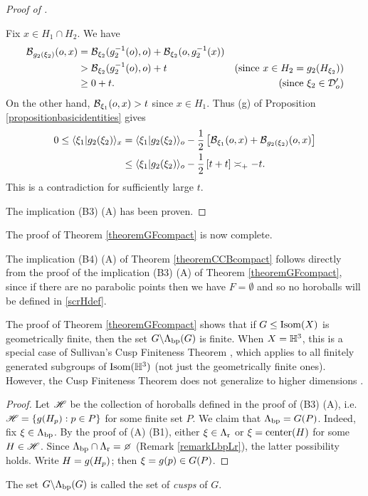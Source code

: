 \begin{proof}[Proof of  \implies {}]
\begin{subproof}
Fix $x\in H_1\cap H_2$. We have
\begin{align*}
\operatorname{\mathcal B}_{g_2(\xi_2)}(o,x) &= \operatorname{\mathcal B}_{\xi_2}(g_2^{-1}(o),o) + \operatorname{\mathcal B}_{\xi_2}(o,g_2^{-1}(x))\\
&> \operatorname{\mathcal B}_{\xi_2}(g_2^{-1}(o),o) + t & \textup{(since $x\in H_2 = g_2(H_{\xi_2})$)}\\
&\geq 0 + t. & \textup{(since $\xi_2\in \mathcal D_o'$)}
\end{align*}
On the other hand, $\operatorname{\mathcal B}_{\xi_1}(o,x) > t$ since $x\in H_1$. Thus (g) of Proposition \ref{propositionbasicidentities} gives
\begin{align*}
0\leq \langle \xi_1 | g_2(\xi_2)\rangle_x &= \langle \xi_1 | g_2(\xi_2)\rangle_o - \frac12\left[\operatorname{\mathcal B}_{\xi_1}(o,x) + \operatorname{\mathcal B}_{g_2(\xi_2)}(o,x)\right]\\
&\leq \langle \xi_1 | g_2(\xi_2)\rangle_o - \frac12\left[t + t\right] \asymp_+ -t.
\end{align*}
This is a contradiction for sufficiently large $t$.
\end{subproof}
\noindent The implication (B3) \implies (A) has been proven.
\end{proof}
\noindent The proof of Theorem \ref{theoremGFcompact} is now complete.




\begin{remark}
\label{remarkGFCCBcompact}
The implication (B4) \implies (A) of Theorem \ref{theoremCCBcompact} follows directly from the proof of the implication (B3) \implies (A) of Theorem \ref{theoremGFcompact}, since if there are no parabolic points then we have $F = \emptyset$ and so no horoballs will be defined in \eqref{scrHdef}.
\end{remark}



\begin{observation}
\label{observationPfinite}
The proof of Theorem \ref{theoremGFcompact} shows that if $G\leq\operatorname{Isom}(X)$ is geometrically finite, then the set $G\backslash\Lambda_{\mathrm{bp}}(G)$ is finite. When $X = \H^3$, this is a special case of Sullivan's Cusp Finiteness Theorem \cite{Sullivan_cusp_finiteness}, which applies to all finitely generated subgroups of $\Isom(\H^3)$ (not just the geometrically finite ones). However, the Cusp Finiteness Theorem does not generalize to higher dimensions \cite{Kapovich3}.
\end{observation}
\begin{proof}
Let $\mathscr H$ be the collection of horoballs defined in the proof of (B3) \implies (A), i.e. $\mathscr H = \{g(H_p) : p\in P\}$ for some finite set $P$. We claim that $\Lambda_{\mathrm{bp}} = G(P)$. Indeed, fix $\xi\in\Lambda_{\mathrm{bp}}$. By the proof of (A) \implies (B1), either $\xi\in\Lambda_{\mathrm r}$ or $\xi = \operatorname{center}(H)$ for some $H\in\mathscr H$. Since $\Lbp\cap\Lr = \emptyset$ (Remark \ref{remarkLbpLr}), the latter possibility holds. Write $H = g(H_p)$; then $\xi = g(p)\in G(P)$.
\end{proof}
The set $G\backslash\Lambda_{\mathrm{bp}}(G)$ is called the set of \emph{cusps} of $G$.

